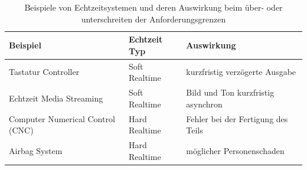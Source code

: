 \begin{table}
\centering
	\begin{tabular}{|l|l|l|}
		\hline
		\textbf{Beispiel} & \textbf{Echtzeit Typ}  & \textbf{Auswirkung} \\
		\hline
		Tastatur Controller & Soft Realtime & kurzfristig verzögerte Ausgabe \\
		\hline
		Echtzeit Media Streaming  & Soft Realtime & Bild und Ton kurzfristig asynchron \\
		\hline
		Computer Numerical Control (CNC)  & Hard Realtime & Fehler bei der Fertigung des Teils\\
		\hline
		Airbag System  & Hard Realtime & möglicher Personenschaden\\
		\hline
	\end{tabular}
	\caption{Beispiele von Echtzeitsystemen und deren Auswirkung beim über- oder unterschreiten der Anforderungsgrenzen}
	\label{tab:BeispieleEchtzeitsystem}
\end{table}




